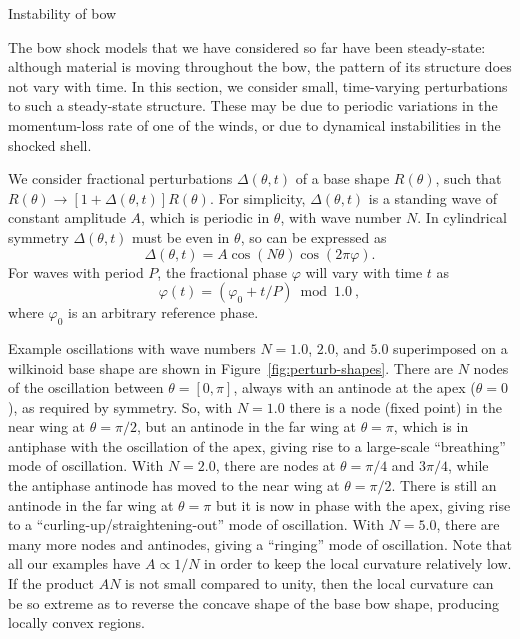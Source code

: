 Instability of bow \citep{Blondin:1998a}

The bow shock models that we have considered so far have been
steady-state: although material is moving throughout the bow, the
pattern of its structure does not vary with time.  In this section, we
consider small, time-varying perturbations to such a steady-state
structure.  These may be due to periodic variations in the
momentum-loss rate of one of the winds, or due to dynamical
instabilities in the shocked shell.

We consider fractional perturbations \(\Delta(\theta, t)\) of a base shape
\(R(\theta)\), such that
\(R(\theta) \to [1 + \Delta(\theta, t)] R(\theta)\).  For simplicity,
\(\Delta(\theta, t)\) is a standing wave of constant amplitude \(A\), which is
periodic in \(\theta\), with wave number \(N\).  In cylindrical symmetry
\(\Delta(\theta, t)\) must be even in \(\theta\), so can be expressed as
\begin{equation}
  \label{eq:standing-wave}
  \Delta(\theta, t) = A \cos(N \theta) \cos(2\pi \varphi) . 
\end{equation}
For waves with period \(P\), the fractional phase \(\varphi\) will
vary with time \(t\) as
\begin{equation}
  \label{eq:fractional-phase}
  \varphi(t) = (\varphi_0 + t/P) \bmod 1.0\ ,
\end{equation}
where \(\varphi_0\) is an arbitrary reference phase.

Example oscillations with wave numbers \(N = 1.0\), \(2.0\), and
\(5.0\) superimposed on a wilkinoid base shape are shown in
Figure~\ref{fig:perturb-shapes}.  There are \(N\) nodes of the
oscillation between \(\theta = [0, \pi]\), always with an antinode at the apex
(\(\theta = 0\)), as required by symmetry.  So, with \(N = 1.0\) there is a
node (fixed point) in the near wing at \(\theta = \pi/2\), but an antinode in
the far wing at \(\theta = \pi\), which is in antiphase with the oscillation
of the apex, giving rise to a large-scale ``breathing'' mode of
oscillation.  With \(N = 2.0\), there are nodes at \(\theta = \pi/4\) and
\(3\pi/4\), while the antiphase antinode has moved to the near wing at
\(\theta = \pi/2\).  There is still an antinode in the far wing at
\(\theta = \pi\) but it is now in phase with the apex, giving rise to a
``curling-up/straightening-out'' mode of oscillation.  With
\(N = 5.0\), there are many more nodes and antinodes, giving a
``ringing'' mode of oscillation.  Note that all our examples have
\(A \propto 1/N\) in order to keep the local curvature relatively low.  If
the product \(A N\) is not small compared to unity, then the local
curvature can be so extreme as to reverse the concave shape of the
base bow shape, producing locally convex regions.


